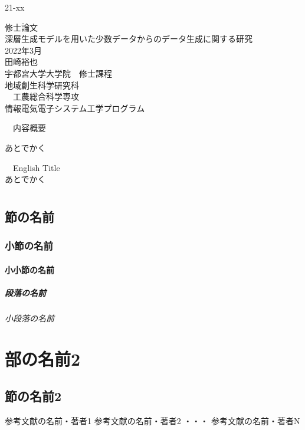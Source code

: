 \documentclass[a5j,10.5pt]{jreport}
\begin{document}
\begin{flushright}
{\Huge 21-xx}
\end{flushright}

\begin{center}
{\huge 修士論文}\\

\vspace*{1cm}
{\LARGE 深層生成モデルを用いた少数データからのデータ生成に関する研究}\\
\vspace*{2cm}
{\LARGE  2022年3月}\\
\vspace*{1cm}
{\LARGE  田崎裕也}\\
\vspace*{3cm}
{\Large  宇都宮大学大学院　修士課程}\\
\vspace*{1cm}
{\Large 地域創生科学研究科}\\
\vspace*{1cm}
{\Large 　工農総合科学専攻} \\
\vspace*{1cm}
{\Large 情報電気電子システム工学プログラム}\\
\end{center}
\thispagestyle{empty}
\clearpage
\addtocounter{page}{-1}
\newpage
\begin{center}
    {\Huge　内容概要}\\
\end{center}
あとでかく
\newpage
\begin{center}
    {\Huge　English Title}\\
    あとでかく
\end{center}
\newpage
\tableofcontents
\clearpage
\chapter{}
\section{節の名前}
\subsection{小節の名前}
\subsubsection{小小節の名前}
\paragraph{段落の名前}
\subparagraph{小段落の名前}
\chapter{部の名前2}
\section{節の名前2}
\begin{thebibliography}{数字}
   参考文献の名前・著者1
   参考文献の名前・著者2
  ・・・
   参考文献の名前・著者N
\end{thebibliography}
\end{document}
